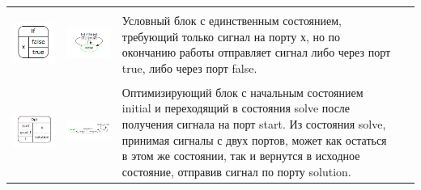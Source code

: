 \documentclass[koi8-r,usehyperref,12pt]{G7-32}
\begin{document}
\begin{table}[here]
\begin{tabular}{c|c|>{\centering}m{5cm} l}
\\ \hline 
\\
\includegraphics[scale=0.35]{if_block.png}&
\includegraphics[scale=0.55]{if_fa.png}&
\footnotesize{Условный блок с единственным состоянием, требующий только сигнал на порту х, но по окончанию работы отправляет сигнал либо через порт true, либо через порт false.\\} & ~
\\  
\hline 
\\
\includegraphics[scale=0.25]{opt_block.png}&
\includegraphics[scale=0.4]{opt_fa2.png}& 
\footnotesize{ Оптимизирующий блок с начальным состоянием initial и переходящий в состояния solve после получения сигнала на порт start. Из состояния solve, принимая сигналы с двух портов, может как остаться в этом же состоянии, так и вернутся в исходное состояние, отправив сигнал по порту solution.\\} & ~
\\ \hline


\end{tabular}
\end{table}
\end{document}
